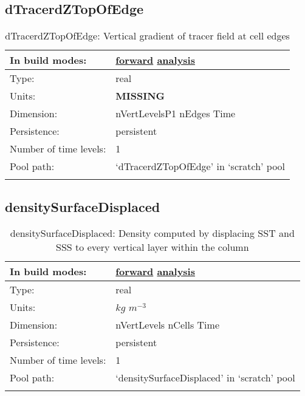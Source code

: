 \subsection[dTracerdZTopOfEdge]{dTracerdZTopOfEdge}
\label{subsec:var_sec_scratch_dTracerdZTopOfEdge}
\begin{center}
\begin{longtable}{| p{2.0in} | p{4.0in} |}
        \hline 
        In build modes: & \hyperref[subsec:forward_var_tab_scratch]{forward} \hyperref[subsec:analysis_var_tab_scratch]{analysis} \\
        \hline 
        Type: & real \\
        \hline 
        Units: & {\bf \color{red} MISSING} \\
        \hline 
        Dimension: & nVertLevelsP1 nEdges Time \\
        \hline 
        Persistence: & persistent \\
        \hline 
        Number of time levels: & 1 \\
        \hline 
            Pool path: & `dTracerdZTopOfEdge' in `scratch' pool \\
		 \hline 
    \caption{dTracerdZTopOfEdge: Vertical gradient of tracer field at cell edges}
\end{longtable}
\end{center}
\subsection[densitySurfaceDisplaced]{densitySurfaceDisplaced}
\label{subsec:var_sec_scratch_densitySurfaceDisplaced}
\begin{center}
\begin{longtable}{| p{2.0in} | p{4.0in} |}
        \hline 
        In build modes: & \hyperref[subsec:forward_var_tab_scratch]{forward} \hyperref[subsec:analysis_var_tab_scratch]{analysis} \\
        \hline 
        Type: & real \\
        \hline 
        Units: & $kg$ $m^{-3}$ \\
        \hline 
        Dimension: & nVertLevels nCells Time \\
        \hline 
        Persistence: & persistent \\
        \hline 
        Number of time levels: & 1 \\
        \hline 
            Pool path: & `densitySurfaceDisplaced' in `scratch' pool \\
		 \hline 
    \caption{densitySurfaceDisplaced: Density computed by displacing SST and SSS to every vertical layer within the column}
\end{longtable}
\end{center}
